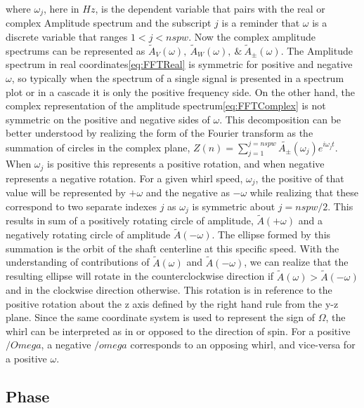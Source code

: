 where $ \omega_j $, here in $ Hz $, is the dependent variable that pairs with the real or complex Amplitude spectrum and the subscript $ j $ is a reminder that $ \omega $ is a discrete variable that ranges $ 1<j<nspw $. Now the complex amplitude spectrums can be represented as $ \tilde{A}_V(\omega),\ \tilde{A}_W(\omega),\ \&\ \tilde{A}_\pm(\omega) $. The Amplitude spectrum in real coordinates\eqref{eq:FFTReal} is symmetric for positive and negative $ \omega $, so typically when the spectrum of a single signal is presented in a spectrum plot or in a cascade it is only the positive frequency side. On the other hand, the complex representation of the amplitude spectrum\eqref{eq:FFTComplex} is not symmetric on the positive and negative sides of $ \omega $. This decomposition can be better understood by realizing the form of the Fourier transform as the summation of circles in the complex plane, $ Z(n) = \sum_{j=1}^{j=nspw}\tilde{A_\pm}(\omega_j)e^{i\omega_j t} $. When $ \omega_j $ is positive this represents a positive rotation, and when negative represents a negative rotation. For a given whirl speed, $ \omega_j $, the positive of that value will be represented by $ +\omega $ and the negative as $ -\omega $ while realizing that these correspond to two separate indexes $ j $ as $ \omega_j $ is symmetric about $ j=nspw/2 $. This results in sum of a positively rotating circle of amplitude, $ \tilde{A}(+\omega) $ and a negatively rotating circle of amplitude $ \tilde{A}(-\omega) $. The ellipse formed by this summation is the orbit of the shaft centerline at this specific speed. With the understanding of contributions of $ \tilde{A}(\omega) $ and $ \tilde{A}(-\omega) $, we can realize that the resulting ellipse will rotate in the counterclockwise direction if $ \tilde{A}(\omega)> \tilde{A}(-\omega) $ and in the clockwise direction otherwise. This rotation is in reference to the positive rotation about the z axis defined by the right hand rule from the y-z plane. Since the same coordinate system is used to represent the sign of $ \Omega $, the whirl can be interpreted as in or opposed to the direction of spin. For a positive $ /Omega $, a negative $ /omega $ corresponds to an opposing whirl, and vice-versa for a positive $ \omega $.
\subsection{Phase}
